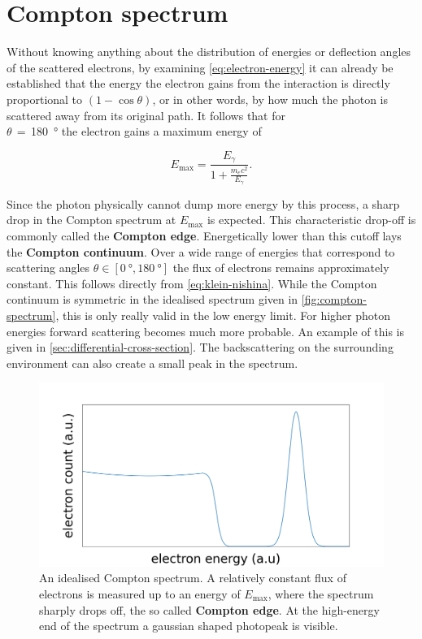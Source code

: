 
\section{Compton spectrum}
\label{sec:compton-spectrum}

Without knowing anything about the distribution of energies or deflection angles of
the scattered electrons, by examining \autoref{eq:electron-energy} it can already be
established that the energy the electron gains from the interaction is directly
proportional to $\left(1-\cos\theta\right)$, or in other words, by how much the
photon is scattered away from its original path. It follows that for \\
$\theta\,=\,$\SI{180}{\degree} the electron gains a maximum energy of

\begin{equation}
\label{eq:maximal-energy}
E_\text{max}=\frac{E_\gamma}{1+\frac{m_e c^2}{E_\gamma}}.
\end{equation}

Since the photon physically cannot dump more energy by this process, a sharp drop in
the Compton spectrum at $E_\text{max}$ is expected. This characteristic drop-off is
commonly called the \textbf{Compton edge}. Energetically lower than this cutoff lays
the \textbf{Compton continuum}. Over a wide range of energies that correspond to 
scattering angles $\theta\in[\SI{0}{\degree},\SI{180}{\degree}]$ the flux of 
electrons remains approximately constant. This follows directly from 
\autoref{eq:klein-nishina}. While the Compton continuum is symmetric in the idealised
spectrum given in \autoref{fig:compton-spectrum}, this is only really valid in the 
low energy limit. For higher photon energies forward scattering becomes much more
probable. An example of this is given in \autoref{sec:differential-cross-section}. 
The backscattering on the surrounding environment can also create a small peak in the spectrum.

\begin{figure}
	\includegraphics[width=1.0\textwidth]{fig/compton-spectrum}
	\caption{An idealised Compton spectrum. A relatively constant flux of
	electrons is measured up to an energy of $E_\text{max}$, where the spectrum
	sharply drops off, the so called \textbf{Compton edge}. At the high-energy end of the spectrum a gaussian shaped
	photopeak is visible.}
	\label{fig:compton-spectrum}
\end{figure}

